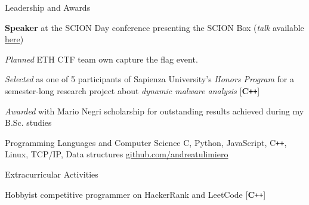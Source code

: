 \documentclass{resume}
\begin{document}
\begin{rSection}{Leadership and Awards}

\begin{rSubsection}{}{}{}{}
\item \textbf{Speaker} at the SCION Day conference presenting the SCION Box (\textit{talk} available \href{https://video.ethz.ch/events/2019/scion/61dd8a87-3894-489d-99d3-77ca66c5ad38.html}{here})
\item \textit{Planned} ETH CTF team own capture the flag event.
\item \textit{Selected} as one of 5 participants of Sapienza University's \textit{Honors Program} for a semester-long research project about \textit{dynamic malware analysis} [\textbf{C\texttt{++}}]
\item \textit{Awarded} with Mario Negri scholarship for outstanding results achieved during my B.Sc. studies
\end{rSubsection}

\end{rSection}


\begin{rSection}{Programming Languages and Computer Science}
C, Python, JavaScript, C\texttt{++}, Linux, TCP/IP, Data structures \hfill \href{https://github.com/andreatulimiero}{github.com/andreatulimiero}
\end{rSection}


\begin{rSection}{Extracurricular Activities}

\begin{rSubsection}{}{}{}{}
\item Hobbyist competitive programmer on HackerRank and LeetCode [\textbf{C}\texttt{++}]
\end{rSubsection}
\end{rSection}
\end{document}
